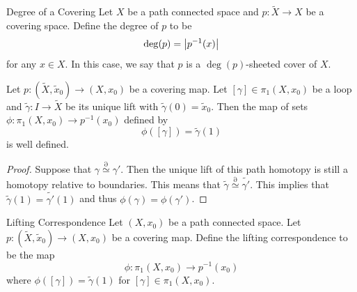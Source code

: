 \documentclass[a4paper]{article}
\begin{document}
\begin{defn}{Degree of a Covering}{} Let $X$ be a path connected space and $p:\tilde{X}\to X$ be a covering space. Define the degree of $p$ to be $$\deg(p)=\abs{p^{-1}(x)}$$ for any $x\in X$. In this case, we say that $p$ is a $\deg(p)$-sheeted cover of $X$. 
\end{defn}

\begin{lmm}{}{} Let $p:(\tilde{X},\tilde{x}_0)\to(X,x_0)$ be a covering map. Let $[\gamma]\in\pi_1(X,x_0)$ be a loop and $\tilde{\gamma}:I\to\tilde{X}$ be its unique lift with $\tilde{\gamma}(0)=\tilde{x}_0$. Then the map of sets $\phi:\pi_1(X,x_0)\to p^{-1}(x_0)$ defined by $$\phi([\gamma])=\tilde{\gamma}(1)$$ is well defined. \tcbline
\begin{proof}
Suppose that $\gamma\overset{\partial}{\simeq}\gamma'$. Then the unique lift of this path homotopy is still a homotopy relative to boundaries. This means that $\tilde{\gamma}\overset{\partial}{\simeq}\tilde{\gamma'}$. This implies that $\tilde{\gamma}(1)=\tilde{\gamma'}(1)$ and thus $\phi(\gamma)=\phi(\gamma')$. 
\end{proof}
\end{lmm}

\begin{defn}{Lifting Correspondence}{} Let $(X,x_0)$ be a path connected space. Let $p:(\tilde{X},\tilde{x}_0)\to(X,x_0)$ be a covering map. Define the lifting correspondence to be the map $$\phi:\pi_1(X,x_0)\to p^{-1}(x_0)$$ where $\phi([\gamma])=\tilde{\gamma}(1)$ for $[\gamma]\in\pi_1(X,x_0)$. 
\end{defn}
\end{document}
